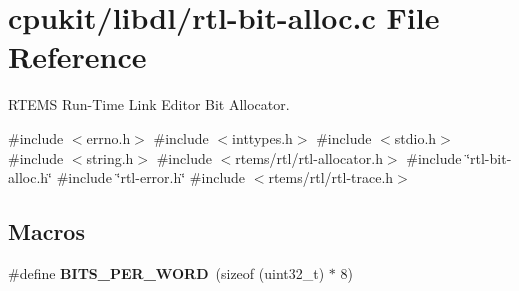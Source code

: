 \hypertarget{rtl-bit-alloc_8c}{}\section{cpukit/libdl/rtl-\/bit-\/alloc.c File Reference}
\label{rtl-bit-alloc_8c}


R\+T\+E\+MS Run-\/\+Time Link Editor Bit Allocator.  


{\ttfamily \#include $<$errno.\+h$>$}\newline
{\ttfamily \#include $<$inttypes.\+h$>$}\newline
{\ttfamily \#include $<$stdio.\+h$>$}\newline
{\ttfamily \#include $<$string.\+h$>$}\newline
{\ttfamily \#include $<$rtems/rtl/rtl-\/allocator.\+h$>$}\newline
{\ttfamily \#include \char`\"{}rtl-\/bit-\/alloc.\+h\char`\"{}}\newline
{\ttfamily \#include \char`\"{}rtl-\/error.\+h\char`\"{}}\newline
{\ttfamily \#include $<$rtems/rtl/rtl-\/trace.\+h$>$}\newline
\subsection*{Macros}
\begin{DoxyCompactItemize}
\item 
\mbox{\label{rtl-bit-alloc_8c_af859a98f57110e5243e8f0541319e43b}} 
\#define {\bfseries B\+I\+T\+S\+\_\+\+P\+E\+R\+\_\+\+W\+O\+RD}~(sizeof (uint32\+\_\+t) $\ast$ 8)
\end{DoxyCompactItemize}
